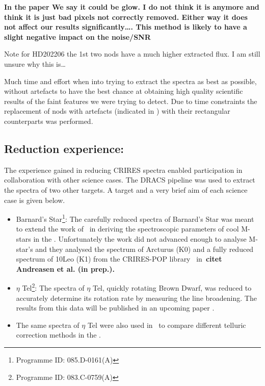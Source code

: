

\textbf{In the paper We say it could be glow. I do not think it is anymore and think it is just bad pixels not correctly removed. Either way it does not affect our results significantly\ldots{}.
This method is likely to have a slight negative impact on the noise/{SNR}}

Note for HD202206 the 1st two nods have a much higher extracted flux. I am still unsure why this is\ldots{}


Much time and effort when into trying to extract the spectra as best as possible, without artefacts to have the best chance at obtaining high quality scientific results of the faint features we were trying to detect.
Due to time constraints the replacement of nods with artefacts (indicated in ) with their rectangular counterparts was performed.

\subsection{Reduction experience:}
\label{subsec:experience}
The experience gained in reducing {CRIRES} spectra enabled participation in collaboration with other science cases. The {DRACS} pipeline was used to extract the spectra of two other targets. A target and a very brief aim of each science case is given below.
\begin{itemize}
\item Barnard's Star\footnote{Programme {{ID}}: 085.D-0161(A)}: The carefully reduced \nir{} spectra of Barnard's Star was meant to extend the work of~\citet{andreasen_nearinfrared_2016} in deriving the spectroscopic parameters of cool M-stars in the \nir{}. Unfortunately the work did not advanced enough to analyse M-star's and they analysed the spectrum of {Arcturus} (K0) and a fully reduced spectrum of {10Leo} (K1) from the {CRIRES}-POP library~\cite{nicholls_crirespop_2017} in~\bf{citet {Andreasen et al. (in prep.)}}.
\item \(\eta\) Tel\footnote{Programme {{ID}}: 083.C-0759(A)}: The spectra of {\(\eta\) Tel}, quickly rotating Brown Dwarf, was reduced to accurately determine its rotation rate by measuring the line broadening. The results from this data will be published in an upcoming paper .
\item The same spectra of \(\eta\) Tel were also used in~\citet{ulmer-moll_telluric_2018} to compare different telluric correction methods in the \nir{}.
\end{itemize}


